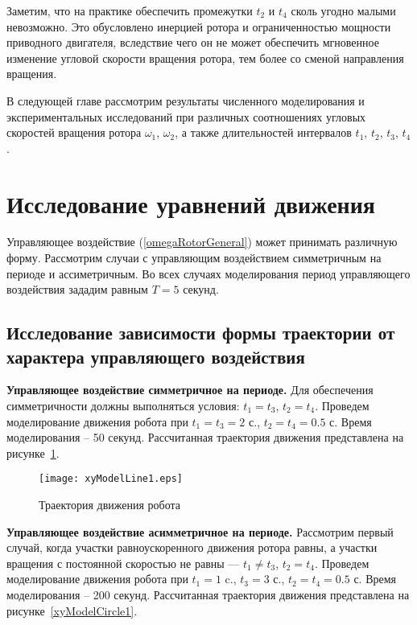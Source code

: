 Заметим, что на практике обеспечить промежутки $t_2$ и $t_4$ сколь угодно малыми невозможно. Это обусловлено инерцией ротора и ограниченностью мощности приводного двигателя, вследствие чего он не может обеспечить мгновенное изменение угловой скорости вращения ротора, тем более со сменой направления вращения.

В следующей главе рассмотрим результаты численного моделирования и экспериментальных исследований при различных соотношениях угловых скоростей вращения ротора $\omega_1$, $\omega_2$, а также длительностей интервалов $t_1$, $t_2$, $t_3$, $t_4$.


\section{Исследование уравнений движения}

Управляющее воздействие (\ref{omegaRotorGeneral}) может принимать различную форму. Рассмотрим случаи с управляющим воздействием симметричным на периоде и ассиметричным. Во всех случаях моделирования период управляющего воздействия зададим равным $T=5$ секунд. 


\subsection{Исследование зависимости формы траектории от характера управляющего воздействия}



\textbf{Управляющее воздействие симметричное на периоде.} Для обеспечения симметричности должны выполняться условия: $t_1=t_3$, $t_2=t_4$. Проведем моделирование движения робота при $t_1=t_3=2$ с., $t_2=t_4 = 0.5$ с. Время моделирования -- 50 секунд. Рассчитанная траектория движения представлена на рисунке~\ref{xyModelLine1}.

\begin{figure}[!ht]
	\centering
	\texttt{[image: xyModelLine1.eps]}
	\caption{Траектория движения робота}
	\label{xyModelLine1}
\end{figure}

\textbf{Управляющее воздействие асимметричное на периоде.} Рассмотрим первый случай, когда участки равноускоренного движения ротора равны, а участки вращения с постоянной скоростью не равны --- $t_1 \neq t_3$, $t_2=t_4$. Проведем моделирование движения робота при $t_1=1$ c., $t_3=3$ с., $t_2=t_4 = 0.5$ с. Время моделирования -- 200 секунд. Рассчитанная траектория движения представлена на рисунке~\ref{xyModelCircle1}.

